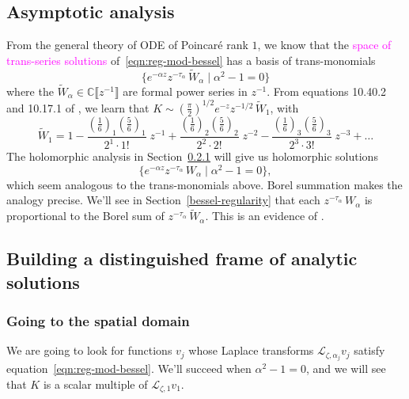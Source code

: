 \documentclass{article}
\newcommand{\C}{\mathbb{C}}
\newcommand{\series}[1]{\tilde{#1}}
\newcommand{\laplace}{\mathcal{L}}
\theoremstyle{definition}
\theoremstyle{plain}
\newenvironment{old}{\color{RoyalBlue}}{\color{black}}
\begin{document}
\begin{old}
\subsection{Asymptotic analysis}
From the general theory of ODE of Poincar\'e rank $1$, we know that the \textcolor{magenta}{space of trans-series solutions} of~\eqref{eqn:reg-mod-bessel} has a basis of trans-monomials
\[ \{ e^{-\alpha z} z^{-\tau_\alpha}\,\series{W}_\alpha \mid \alpha^2 - 1 = 0 \} \]
where the $\series{W}_\alpha\in\C\llbracket z^{-1} \rrbracket$ are formal power series in $z^{-1}$. From equations 10.40.2 and 10.17.1 of \cite{dlmf}, we learn that $K \sim \left(\tfrac{\pi}{2}\right)^{1/2} e^{-z} z^{-1/2}\,\series{W}_1$, with
\begin{equation}\label{bessel-asymp}
\series{W}_1 = 1 - \frac{(\tfrac{1}{6})_1 (\tfrac{5}{6})_1}{2^1 \cdot 1!}\;z^{-1} + \frac{(\tfrac{1}{6})_2 (\tfrac{5}{6})_2}{2^2 \cdot 2!}\;z^{-2} - \frac{(\tfrac{1}{6})_3 (\tfrac{5}{6})_3}{2^3 \cdot 3!}\;z^{-3} + \ldots
\end{equation}
The holomorphic analysis in Section~\ref{spatial} will give us holomorphic solutions
\[ \{ e^{-\alpha z} z^{-\tau_\alpha}\,W_\alpha \mid \alpha^2 - 1 = 0 \}, \]
which seem analogous to the trans-monomials above. Borel summation makes the analogy precise. We’ll see in Section~\ref{bessel-regularity} that each $z^{-\tau_\alpha}\,W_\alpha$ is proportional to the Borel sum of $z^{-\tau_\alpha}\,\series{W}_\alpha$. This is an evidence of \cite[Theorem~4]{reg-sing-volterra}.
%
\subsection{Building a distinguished frame of analytic solutions}
\subsubsection{Going to the spatial domain}\label{spatial}
We are going to look for functions $v_j$ whose Laplace transforms $\laplace_{\zeta, \alpha_j} v_j$ satisfy equation~\eqref{eqn:reg-mod-bessel}. We’ll succeed when $\alpha^2 - 1 = 0$, and we will see that $K$ is a scalar multiple of $\laplace_{\zeta, 1} v_1$.


\end{old}
\end{document}
